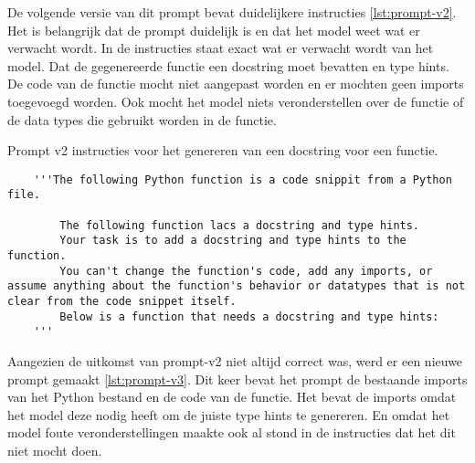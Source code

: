 De volgende versie van dit prompt bevat duidelijkere instructies \ref{lst:prompt-v2}.
Het is belangrijk dat de prompt duidelijk is en dat het model weet wat er verwacht wordt. 
In de instructies staat exact wat er verwacht wordt van het model. Dat de gegenereerde functie een docstring moet bevatten en type hints.
De code van de functie mocht niet aangepast worden en er mochten geen imports toegevoegd worden.
Ook mocht het model niets veronderstellen over de functie of de data types die gebruikt worden in de functie.

\begin{listing}
    \caption{Prompt v2 instructies voor het genereren van een docstring voor een functie.}
    \label{lst:prompt-v2}
    \begin{verbatim}
    '''The following Python function is a code snippit from a Python file. 

        The following function lacs a docstring and type hints.
        Your task is to add a docstring and type hints to the function.
        You can't change the function's code, add any imports, or assume anything about the function's behavior or datatypes that is not clear from the code snippet itself.
        Below is a function that needs a docstring and type hints:
    '''
    \end{verbatim}
\end{listing}

Aangezien de uitkomst van prompt-v2 niet altijd correct was, werd er een nieuwe prompt gemaakt \ref{lst:prompt-v3}.
Dit keer bevat het prompt de bestaande imports van het Python bestand en de code van de functie.
Het bevat de imports omdat het model deze nodig heeft om de juiste type hints te genereren.
En omdat het model foute veronderstellingen maakte ook al stond in de instructies dat het dit niet mocht doen.


